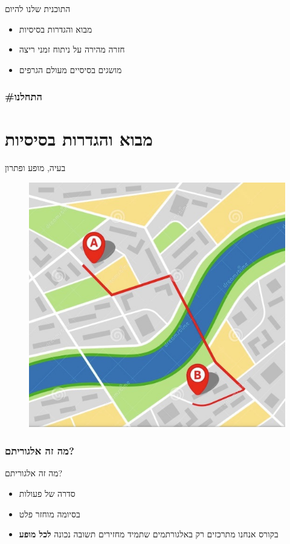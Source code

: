 \documentclass[handout]{beamer}
\begin{document}
\begin{frame}{התוכנית שלנו להיום}
\pause
\begin{itemize}[<+->]
	\item מבוא והגדרות בסיסיות 
	\item חזרה מהירה על ניתוח זמני ריצה
	\item מושגים בסיסיים מעולם הגרפים
\end{itemize}
\end{frame}
\section{\#התחלנו}
\part{מבוא והגדרות בסיסיות}
\frame{\partpage}
\begin{frame}{בעיה, מופע ופתרון}
\begin{figure}
	\centering
	\includegraphics[width=0.7\linewidth]{imgs/screenshot001.jpg}
\end{figure}

\end{frame}
 \section{מה זה אלגוריתם?}
\begin{frame}{מה זה אלגוריתם?}



\pause
\begin{itemize}[<+->]
	\item סדרה של פעולות
	\item בסיומה מוחזר פלט
	\item בקורס אנחנו מתרכזים רק באלגורתמים שתמיד מחזירים תשובה נכונה \textbf{לכל מופע}
\end{itemize}
\end{frame}
\end{document}
